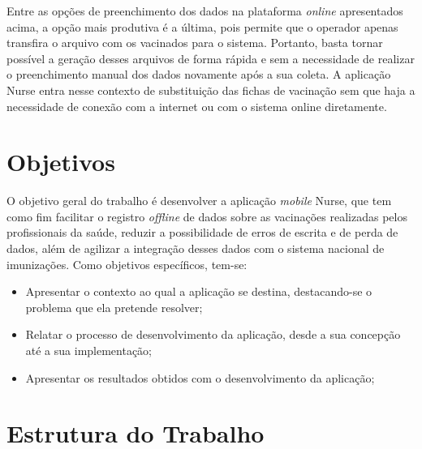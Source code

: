 Entre as opções de preenchimento dos dados na plataforma \textit{online} apresentados acima, a opção mais produtiva é a última, pois permite que o operador apenas transfira o arquivo com os vacinados para o sistema. Portanto, basta tornar possível a geração desses arquivos de forma rápida e sem a necessidade de realizar o preenchimento manual dos dados novamente após a sua coleta. A aplicação Nurse entra nesse contexto de substituição das fichas de vacinação sem que haja a necessidade de conexão com a internet ou com o sistema online diretamente.







\section{Objetivos}
\label{cap1:Sec:Objetivos}

O objetivo geral do trabalho é desenvolver a aplicação \textit{mobile} Nurse, que tem como fim facilitar o registro \textit{offline} de dados sobre as vacinações realizadas pelos profissionais da saúde, reduzir a possibilidade de erros de escrita e de perda de dados, além de agilizar a integração desses dados com o sistema nacional de imunizações. Como objetivos específicos, tem-se:
\begin{itemize}
  \item Apresentar o contexto ao qual a aplicação se destina, destacando-se o problema que ela pretende resolver;
  \item Relatar o processo de desenvolvimento da aplicação, desde a sua concepção até a sua implementação;
  \item Apresentar os resultados obtidos com o desenvolvimento da aplicação;
\end{itemize}

\section{Estrutura do Trabalho}
\label{cap1:Sec:EstruturaTrabalho}

